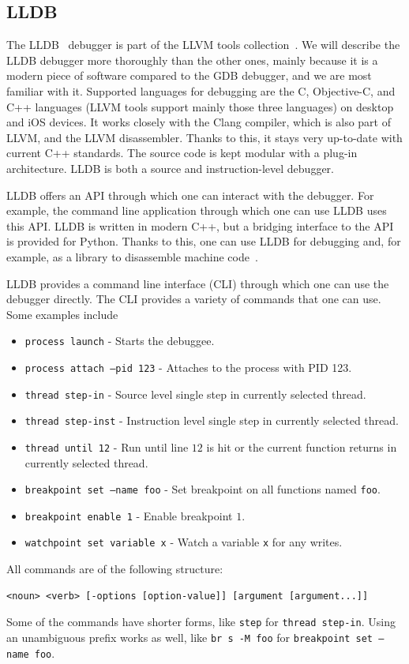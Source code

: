 \subsection{LLDB}\label{section:case-study}
The LLDB~\cite{lldb} debugger is part of the LLVM tools collection~\cite{llvm}.
We will describe the LLDB debugger more thoroughly than the other ones, mainly
because it is a modern piece of software compared to the GDB debugger, and we
are most familiar with it. Supported languages for debugging are the C,
Objective-C, and C++ languages (LLVM tools support mainly those three
languages) on desktop and iOS devices. It works closely with the Clang
compiler, which is also part of LLVM, and the LLVM disassembler. Thanks to
this, it stays very up-to-date with current C++ standards. The source code is
kept modular with a plug-in architecture. LLDB is both a source and
instruction-level debugger.

LLDB offers an API through which one can interact with the debugger. For
example, the command line application through which one can use LLDB uses this
API. LLDB is written in modern C++, but a bridging interface to the API is
provided for Python. Thanks to this, one can use LLDB for debugging and, for
example, as a library to disassemble machine code~\cite{lldb}.

LLDB provides a command line interface (CLI) through which one can use the
debugger directly. The CLI provides a variety of commands that one can use.
Some examples include
\begin{itemize}
    \item \texttt{process launch} - Starts the debuggee.
    \item \texttt{process attach --pid 123} - Attaches to the process with PID
        123.
    \item \texttt{thread step-in} - Source level single step in currently selected thread.
    \item \texttt{thread step-inst} - Instruction level single step in currently selected thread.
    \item \texttt{thread until 12} - Run until line $12$ is hit or the current
        function returns in currently selected thread.
    \item \texttt{breakpoint set --name foo} - Set breakpoint on all functions
        named \texttt{foo}.
    \item \texttt{breakpoint enable 1} - Enable breakpoint $1$.
    \item \texttt{watchpoint set variable x} - Watch a variable \texttt{x} for
        any writes.
\end{itemize}
All commands are of the following structure:
\begin{lstlisting}
<noun> <verb> [-options [option-value]] [argument [argument...]]
\end{lstlisting}
Some of the commands have shorter forms, like \texttt{step} for \texttt{thread
step-in}. Using an unambiguous prefix works as well, like \texttt{br s -M foo}
for \texttt{breakpoint set --name foo}.

